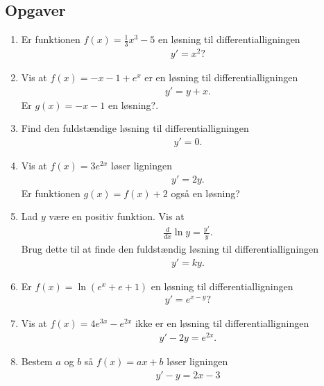 \subsection{Opgaver}

\begin{enumerate}
	\item Er funktionen $ f(x)=\frac{1}{3}x^3-5 $ en løsning til differentialligningen
	\begin{align*}
	y'=x^2?
	\end{align*}
	\item Vis at $f(x)=-x-1+e^x$ er en løsning til differentialligningen
	\begin{align*}
	y'=y+x.
	\end{align*}
	Er $g(x)=-x-1$ en løsning?.
	\item Find den fuldstændige løsning til differentialligningen
	\begin{align*}
	y'=0.
	\end{align*}
	
	\item Vis at $f(x)=3e^{2x}$ løser ligningen
	\begin{align*}
	y'=2y.
	\end{align*}
	Er funktionen $g(x)=f(x)+2$ også en løsning?
	
	
	\item \label{it:diffeq11} Lad $y$ være en positiv funktion. Vis at
	\begin{align*}
	\frac{d}{dx} \ln y= \frac{y'}{y}.
	\end{align*}
	Brug dette til at finde den fuldstændig løsning til differentialligningen
	\begin{align*}
	y'=ky.
	\end{align*}
	
	
	\item Er $f(x)=\ln(e^x+e+1)$ en løsning til differentialligningen
	\begin{align*}
	y'=e^{x-y}?
	\end{align*}
	
	\item Vis at $f(x)=4e^{3x}-e^{2x}$ ikke er en løsning til differentialligningen
	\begin{align*}
	y'-2y=e^{2x}.
	\end{align*}
	
	\item Bestem $a$ og $b$ så $f(x)=ax+b$ løser ligningen
	\begin{align*}
	y'-y=2x-3
	\end{align*}
	

\end{enumerate}
